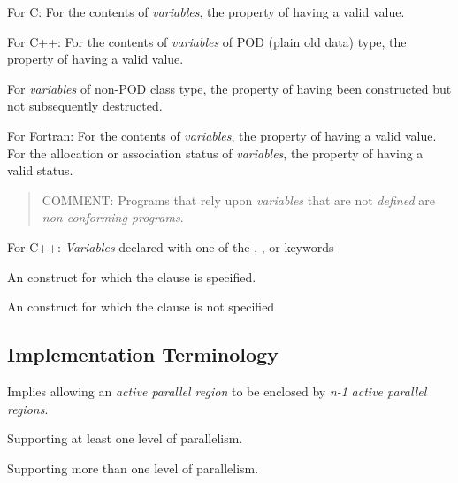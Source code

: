 For C:
\nopagebreak
For the contents of \emph{variables}, the property of having a valid value.

For C++: 
\nopagebreak
For the contents of \emph{variables} of POD (plain old data) type, the property of having 
a valid value.

For \emph{variables} of non-POD class type, the property of having been constructed but 
not subsequently destructed.

For Fortran: 
\nopagebreak
For the contents of \emph{variables}, the property of having a valid value. For the 
allocation or association status of \emph{variables}, the property of having a valid status.

\begin{quote}
COMMENT: Programs that rely upon \emph{variables} that are not \emph{defined} are \emph{non-conforming programs}.
\end{quote}
\glossarydefend

\glossarydefstart
For C++: \emph{Variables} declared with one of the , , or  keywords
\glossarydefend

\glossarydefstart
An  construct for which the  clause is specified.
\glossarydefend
\bigskip

\glossarydefstart
An  construct for which the  clause is not specified
\glossarydefend
\bigskip
\bigskip
\bigskip





\subsection{Implementation Terminology}
\label{subsec:Implementation Terminology}
\glossarydefstart
Implies allowing an \emph{active parallel region} to be enclosed by \emph{n-1} \emph{active parallel 
regions}.
\glossarydefend

\glossarydefstart
Supporting at least one level of parallelism.
\glossarydefend
\bigskip

\glossarydefstart
Supporting more than one level of parallelism.  
\glossarydefend
\bigskip

